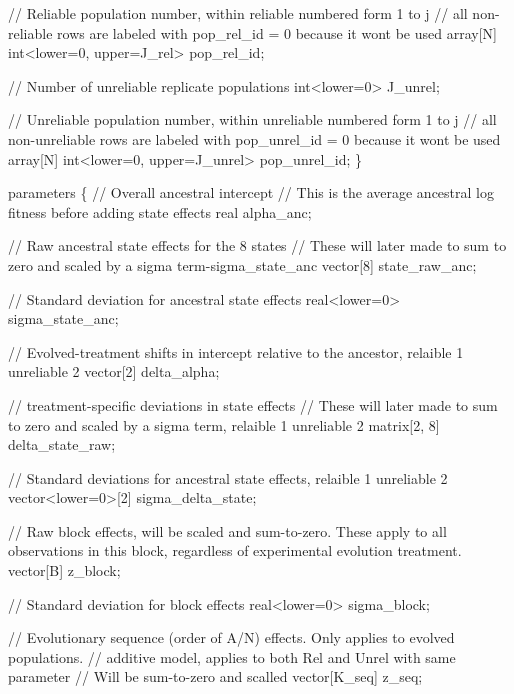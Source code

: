 \documentclass[
]{article}
\newenvironment{Shaded}{\begin{snugshade}}{\end{snugshade}}
\newcommand{\StringTok}[1]{\textcolor[rgb]{0.31,0.60,0.02}{#1}}
\begin{document}
\begin{Shaded}
\begin{Highlighting}[]
\StringTok{  // Reliable population number, within reliable numbered form 1 to j}
\StringTok{  // all non{-}reliable rows are labeled with pop\_rel\_id = 0 because it won\textquotesingle{}t be used}
\StringTok{  array[N] int\textless{}lower=0, upper=J\_rel\textgreater{} pop\_rel\_id;}

\StringTok{  // Number of unreliable replicate populations}
\StringTok{  int\textless{}lower=0\textgreater{} J\_unrel;}

\StringTok{  // Unreliable population number, within unreliable numbered form 1 to j}
\StringTok{  // all non{-}unreliable rows are labeled with pop\_unrel\_id = 0 because it won\textquotesingle{}t be used}
\StringTok{  array[N] int\textless{}lower=0, upper=J\_unrel\textgreater{} pop\_unrel\_id;}
\StringTok{\}}

\StringTok{parameters \{}
\StringTok{  // Overall ancestral intercept}
\StringTok{  // This is the average ancestral log fitness before adding state effects}
\StringTok{  real alpha\_anc;}

\StringTok{  // Raw ancestral state effects for the 8 states}
\StringTok{  // These will later made to sum to zero and scaled by a sigma term{-}sigma\_state\_anc}
\StringTok{  vector[8] state\_raw\_anc;}

\StringTok{  // Standard deviation for ancestral state effects}
\StringTok{  real\textless{}lower=0\textgreater{} sigma\_state\_anc;}

\StringTok{  // Evolved{-}treatment shifts in intercept relative to the ancestor, relaible 1 unreliable 2}
\StringTok{  vector[2] delta\_alpha;}

\StringTok{  // treatment{-}specific deviations in state effects}
\StringTok{  // These will later made to sum to zero and scaled by a sigma term, relaible 1 unreliable 2}
\StringTok{  matrix[2, 8] delta\_state\_raw;}

\StringTok{  // Standard deviations for ancestral state effects, relaible 1 unreliable 2}
\StringTok{  vector\textless{}lower=0\textgreater{}[2] sigma\_delta\_state;}

\StringTok{  // Raw block effects, will be scaled and sum{-}to{-}zero. These apply to all observations in this block, regardless of experimental evolution treatment. }
\StringTok{  vector[B] z\_block;}

\StringTok{  // Standard deviation for block effects}
\StringTok{  real\textless{}lower=0\textgreater{} sigma\_block;}

\StringTok{  // Evolutionary sequence (order of A/N) effects. Only applies to evolved populations. }
\StringTok{  // additive model, applies to both Rel and Unrel with same parameter}
\StringTok{  // Will be sum{-}to{-}zero and scalled}
\StringTok{  vector[K\_seq] z\_seq;}


\end{Highlighting}
\end{Shaded}
\end{document}
